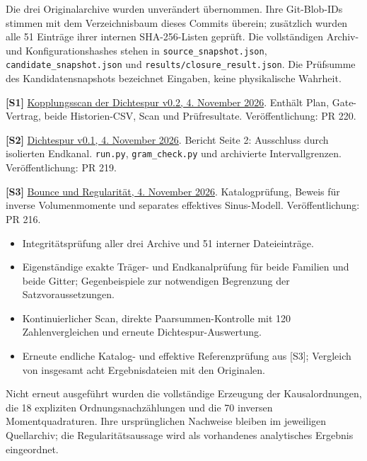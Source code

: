 \documentclass[11pt,a4paper]{article}
\newcommand{\sect}[1]{\par\vspace{3pt}{\sffamily\bfseries\large #1}\par}
\begin{document}
Die drei Originalarchive wurden unverändert übernommen. Ihre Git-Blob-IDs stimmen mit dem Verzeichnisbaum dieses Commits überein; zusätzlich wurden alle 51 Einträge ihrer internen SHA-256-Listen geprüft. Die vollständigen Archiv- und Konfigurationshashes stehen in \texttt{source\_snapshot.json}, \texttt{candidate\_snapshot.json} und \texttt{results/closure\_result.json}. Die Prüfsumme des Kandidatensnapshots bezeichnet Eingaben, keine physikalische Wahrheit.

\sect{Primärquellen}
\textbf{[S1]} \href{https://github.com/thomasmgfeller/x6-spectral-astrolabium/blob/5f7994400869c921dec5b335f04a384a713e5e64/research/rax_cqg/dust_collapse/packages/CST_Staubball_Kopplungsscan_v0_2_Pruefpaket.zip}{Kopplungsscan der Dichtespur v0.2, 4. November 2026}. Enthält Plan, Gate-Vertrag, beide Historien-CSV, Scan und Prüfresultate. Veröffentlichung: PR 220.\par
\textbf{[S2]} \href{https://github.com/thomasmgfeller/x6-spectral-astrolabium/blob/5f7994400869c921dec5b335f04a384a713e5e64/research/rax_cqg/dust_collapse/packages/CST_Staubball_Dichtespur_v0_1_Pruefpaket.zip}{Dichtespur v0.1, 4. November 2026}. Bericht Seite 2: Ausschluss durch isolierten Endkanal. \texttt{run.py}, \texttt{gram\_check.py} und archivierte Intervallgrenzen. Veröffentlichung: PR 219.\par
\textbf{[S3]} \href{https://github.com/thomasmgfeller/x6-spectral-astrolabium/blob/5f7994400869c921dec5b335f04a384a713e5e64/research/rax_cqg/dust_collapse/packages/Staubball_Bounce_Regularitaet_Pruefpaket.zip}{Bounce und Regularität, 4. November 2026}. Katalogprüfung, Beweis für inverse Volumenmomente und separates effektives Sinus-Modell. Veröffentlichung: PR 216.

\sect{Was in diesem Abschluss tatsächlich neu ausgeführt wurde}
\begin{itemize}\setlength\itemsep{0pt}
\item Integritätsprüfung aller drei Archive und 51 interner Dateieinträge.
\item Eigenständige exakte Träger- und Endkanalprüfung für beide Familien und beide Gitter; Gegenbeispiele zur notwendigen Begrenzung der Satzvoraussetzungen.
\item Kontinuierlicher Scan, direkte Paarsummen-Kontrolle mit 120 Zahlenvergleichen und erneute Dichtespur-Auswertung.
\item Erneute endliche Katalog- und effektive Referenzprüfung aus [S3]; Vergleich von insgesamt acht Ergebnisdateien mit den Originalen.
\end{itemize}
Nicht erneut ausgeführt wurden die vollständige Erzeugung der Kausalordnungen, die 18 expliziten Ordnungsnachzählungen und die 70 inversen Momentquadraturen. Ihre ursprünglichen Nachweise bleiben im jeweiligen Quellarchiv; die Regularitätsaussage wird als vorhandenes analytisches Ergebnis eingeordnet.
\end{document}
